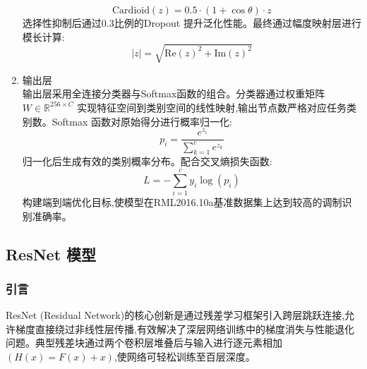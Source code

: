 \documentclass{article}
\begin{document}
\begin{CJK}{UTF8}{gbsn}
\begin{enumerate}
    \begin{equation}
        \text{Cardioid}(z)=0.5\cdot(1+\cos\theta)\cdot z
        \label{eq:cardioid}
    \end{equation}
    选择性抑制后通过0.3比例的Dropout 提升泛化性能。最终通过幅度映射层进行模长计算:
    \begin{equation}
        |z|=\sqrt{\text{Re}(z)^{2}+\text{Im}(z)^{2}}
        \label{eq:magnitude}
    \end{equation}
    \item 输出层 \\
    输出层采用全连接分类器与Softmax函数的组合。分类器通过权重矩阵$W\in\mathbb{R}^{256\times C}$ 实现特征空间到类别空间的线性映射,输出节点数严格对应任务类别数。Softmax 函数对原始得分进行概率归一化:
    \begin{equation}
        p_{i}=\frac{e^{z_{i}}}{\sum_{k=1}^{c}e^{z_{k}}}
        \label{eq:softmax}
    \end{equation}
    归一化后生成有效的类别概率分布。配合交叉熵损失函数:
    \begin{equation}
        L=-\sum_{i=1}^{c}y_{i}\log(p_{i})
        \label{eq:cross_entropy}
    \end{equation}
    构建端到端优化目标,使模型在RML2016.10a基准数据集上达到较高的调制识别准确率。
\end{enumerate}

\subsection{ResNet 模型}
\subsubsection{引言}
ResNet (Residual Network)的核心创新是通过残差学习框架引入跨层跳跃连接,允许梯度直接绕过非线性层传播,有效解决了深层网络训练中的梯度消失与性能退化问题。典型残差块通过两个卷积层堆叠后与输入进行逐元素相加 $(H(x)=F(x)+x)$,使网络可轻松训练至百层深度。


\end{CJK}
\end{document}
